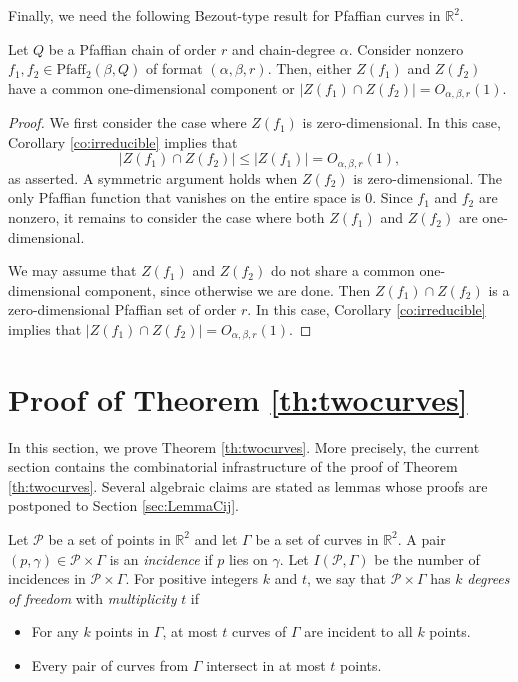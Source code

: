 \documentclass[11pt]{article}
\theoremstyle{definition}
\newcommand{\RR}{\mathbb R}
\newcommand{\pts}{\mathcal{P}}
\newcommand{\curves}{\Gamma}
\newcommand{\Pf}{\mathrm{Pfaff}}
\begin{document}
Finally, we need the following Bezout-type result for Pfaffian curves in $\RR^2$.

\begin{lemma} \label{le:pfBez}
Let $Q$ be a Pfaffian chain of order $r$ and chain-degree $\alpha$. 
Consider nonzero $f_1,f_2 \in \Pf_2(\beta,Q)$ of format $(\alpha,\beta,r)$. 
Then, either $Z(f_1)$ and $Z(f_2)$ have a common one-dimensional component or 
$|Z(f_1)\cap Z(f_2)| = O_{\alpha,\beta,r}(1)$.
\end{lemma}
\begin{proof}
We first consider the case where $Z(f_1)$ is zero-dimensional. 
In this case, Corollary \ref{co:irreducible} implies that 
%
\[ |Z(f_1)\cap Z(f_2)| \le |Z(f_1)| = O_{\alpha,\beta,r}(1), \]
%
as asserted.
A symmetric argument holds when $Z(f_2)$ is zero-dimensional.  
The only Pfaffian function that vanishes on the entire space is $0$.
Since $f_1$ and $f_2$ are nonzero, it remains to consider the case where both $Z(f_1)$ and $Z(f_2)$ are one-dimensional. 

We may assume that $Z(f_1)$ and $Z(f_2)$ do not share a common one-dimensional component, since otherwise we are done.
Then $Z(f_1) \cap Z(f_2)$ is a zero-dimensional Pfaffian set of order $r$.
In this case, Corollary \ref{co:irreducible} implies that $|Z(f_1)\cap Z(f_2)| = O_{\alpha,\beta,r}(1)$.
%
\end{proof}


\section{Proof of Theorem \ref{th:twocurves}}
\label{sec:proofoftheorems}

In this section, we prove Theorem \ref{th:twocurves}. 
More precisely, the current section contains the combinatorial infrastructure of the proof of Theorem \ref{th:twocurves}.
Several algebraic claims are stated as lemmas whose proofs are postponed to Section \ref{sec:LemmaCij}.

Let $\pts$ be a set of points in $\RR^2$ and let $\curves$ be a set of curves in $\RR^2$.
A pair $(p,\gamma)\in \pts\times \curves$ is an \emph{incidence} if $p$ lies on $\gamma$.
Let $I(\pts,\curves)$ be the number of incidences in $\pts\times \curves$.
For positive integers $k$ and $t$, we say that $\pts\times \curves$ has $k$ \emph{degrees of freedom} with \emph{multiplicity} $t$ if 
\begin{itemize}[itemsep=1pt,topsep=1pt]
\item For any $k$ points in $\curves$, at most $t$ curves of $\curves$ are incident to all $k$ points. 
\item Every pair of curves from $\curves$ intersect in at most $t$ points. 
\end{itemize}
\vspace{1mm}
\end{document}
